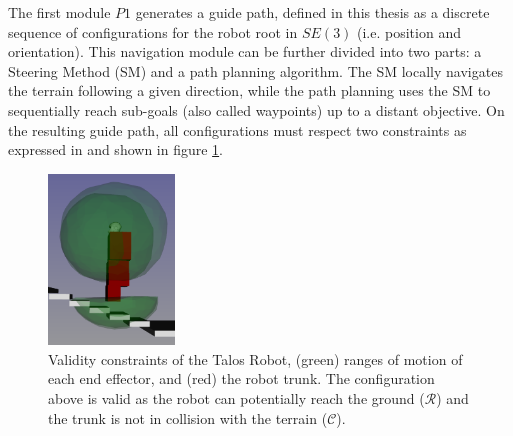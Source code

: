 The first module $P1$ generates a guide path, defined in this thesis as a discrete sequence of configurations for the robot root in $SE(3)$ (i.e. position and orientation).
This navigation module can be further divided into two parts: a Steering Method (SM) and a path planning algorithm.
The SM locally navigates the terrain following a given direction, while the path planning uses the SM to sequentially reach sub-goals (also called waypoints) up to a distant objective. 
On the resulting guide path, all configurations must respect two constraints as expressed in \cite{RB-PRM} and shown in figure \ref{fig:ROMs}.

\begin{figure}
    \centering
    \includegraphics[width=0.3\textwidth]{Figures/Chapter_LEAS/ROMs.png}
    \caption{Validity constraints of the Talos Robot, (green) ranges of motion of each end effector, and (red) the robot trunk. The configuration above is valid as the robot can potentially reach the ground ($\mathcal{R}$) and the trunk is not in collision with the terrain ($\mathcal{C}$).}
    \label{fig:ROMs}
\end{figure}

